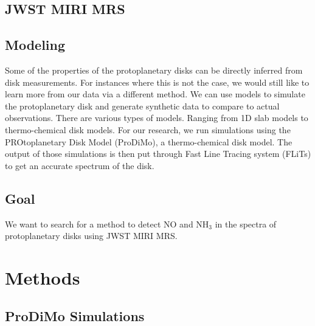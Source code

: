 \documentclass[twoside, single, authoryear, semicolon]{lion-msc}
\newcommand{\4}{$_4$}
\newcommand{\3}{$_3$}
\newcommand{\2}{$_2$}
\begin{document}
\section{JWST MIRI MRS}

\section{Modeling}
Some of the properties of the protoplanetary disks can be directly inferred from disk measurements. For instances where this is not the case, we would still like to learn more from our data via a different method. We can use models to simulate the protoplanetary disk and generate synthetic data to compare to actual observations. There are various types of models. Ranging from 1D slab models to thermo-chemical disk models. For our research, we run simulations using the PROtoplanetary Disk Model (ProDiMo), a thermo-chemical disk model. The output of those simulations is then put through Fast Line Tracing system (FLiTs) to get an accurate spectrum of the disk. 
\section{Goal}
We want to search for a method to detect NO and NH\3 in the spectra of protoplanetary disks using JWST MIRI MRS. 
\chapter{Methods}\label{Ch: Methods}
\section{ProDiMo Simulations}
\end{document}
